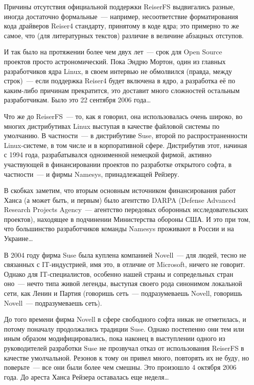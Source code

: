 Причины отсутствия официальной поддержки ReiserFS выдвигались разные, иногда достаточно формальные~--- например, несоответствие форматирования кода драйверов Reiser4 стандарту, принятому в коде ядра; это примерно то же самое, что (для литературных текстов) различие в величине абзацных отступов. 

И так было на протяжении более чем двух лет~--- срок для Open Source проектов просто астрономический. Пока Эндрю Мортон, один из главных разработчиков ядра Linux, в своем интервью не обмолвился (правда, между строк)~--- если поддержка Reiser4 будет включена в ядро, а разработка её по каким-либо причинам прекратится, это доставит много сложностей остальным разработчикам. Было это 22 сентября 2006 года\dots 

Что же до ReiserFS~--- то, как я говорил, она использовалась очень широко, во многих дистрибутивах Linux выступая в качестве файловой системы по умолчанию. В частности~--- в дистрибутиве Suse, второй по распространенности Linux-системе, в том числе и в корпоративной сфере. Дистрибутив этот, начиная с 1994 года, разрабатывался одноименной немецкой фирмой, активно участвующей в финансировании проектов по разработке открытого софта, в частности~--- и фирмы Namesys, принадлежащей Рейзеру. 

В скобках заметим, что вторым основным источником финансирования работ Ханса (а может быть, и первым) было агентство DARPA (Defense Advanced Research Projects Agency~--- агентство передовых оборонных исследовательских проектов), находящее в подчинении Министерства обороны США. И это при том, что большинство разработчиков команды Namesys проживают в России и на Украине\dots 

В 2004 году фирма Suse была куплена компанией Novell~--- для людей, тесно не связанных с IT-индустрией, имя это, в отличие от Microsoft, ничего не говорит. Однако для IT-специалистов, особенно нашей страны и сопредельных стран оно~--- нечто типа живой легенды, выступая своего рода синонимом локальной сети, как Ленин и Партия (говоришь сеть~--- подразумеваешь Novell, говоришь Novell~--- подразумеваешь сеть). 

До того времени фирма Novell в сфере свободного софта никак не отметилась, и потому поначалу продолжались традиции Suse. Однако постепенно они тем или иным образом модифицировались, пока наконец в выступлении одного из руководителей разработки Suse не прозвучал отказ от использования ReiserFS в качестве умолчальной. Резонов к тому он привел много, повторять их не буду, но поверьте~--- все они были более чем смешны. Это произошло 4 октября 2006 года. До ареста Ханса Рейзера оставалась еще неделя\dots 


